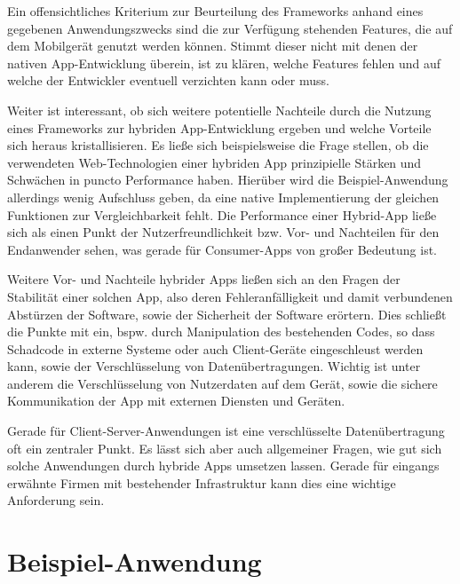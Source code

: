  	Ein offensichtliches Kriterium zur Beurteilung des Frameworks anhand eines gegebenen Anwendungszwecks sind die zur Verfügung stehenden Features, die auf dem Mobilgerät genutzt werden können. Stimmt dieser nicht mit denen der nativen App-Entwicklung überein, ist zu klären, welche Features fehlen und auf welche der Entwickler eventuell verzichten kann oder muss.
 	
 	Weiter ist interessant, ob sich weitere potentielle Nachteile durch die Nutzung eines Frameworks zur hybriden App-Entwicklung ergeben und welche Vorteile sich heraus kristallisieren. 
 	Es ließe sich beispielsweise die Frage stellen, ob die verwendeten Web-Technologien einer hybriden App prinzipielle Stärken und Schwächen in puncto Performance haben. 
 	Hierüber wird die Beispiel-Anwendung allerdings wenig Aufschluss geben, da eine native Implementierung der gleichen Funktionen zur Vergleichbarkeit fehlt. Die Performance einer Hybrid-App ließe sich als einen Punkt der Nutzerfreundlichkeit bzw. Vor- und Nachteilen für den Endanwender sehen, was gerade für Consumer-Apps von großer Bedeutung ist.
 	
 	Weitere Vor- und Nachteile hybrider Apps ließen sich an den Fragen der Stabilität einer solchen App, also deren Fehleranfälligkeit und damit verbundenen Abstürzen der Software, sowie der Sicherheit der Software erörtern. Dies schließt die Punkte mit ein, bspw. durch Manipulation des bestehenden Codes, so dass Schadcode in externe Systeme oder auch Client-Geräte eingeschleust werden kann, sowie der Verschlüsselung von Datenübertragungen. 
 	Wichtig ist unter anderem die Verschlüsselung von Nutzerdaten auf dem Gerät, sowie die sichere Kommunikation der App mit externen Diensten und Geräten.
 	
 	Gerade für Client-Server-Anwendungen ist eine verschlüsselte Datenübertragung oft ein zentraler Punkt. Es lässt sich aber auch allgemeiner Fragen, wie gut sich solche Anwendungen durch hybride Apps umsetzen lassen. Gerade für eingangs erwähnte Firmen mit bestehender Infrastruktur kann dies eine wichtige Anforderung sein.

\section{Beispiel-Anwendung}	\label{sec:bsp-app} 


